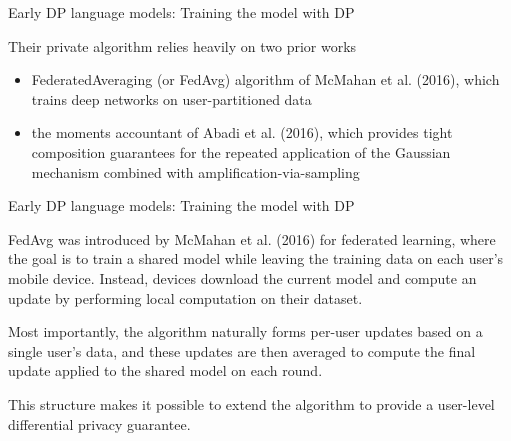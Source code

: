 \documentclass[12pt,aspectratio=169,handout]{beamer}
\begin{document}
\begin{frame}{Early DP language models: Training the model with DP}

Their private algorithm relies heavily on two prior works
\begin{itemize}
\item FederatedAveraging (or FedAvg) algorithm of McMahan et al. (2016), which trains deep networks on user-partitioned data
\item the moments accountant of Abadi et al. (2016), which provides tight composition guarantees for the repeated application of the Gaussian mechanism combined with amplification-via-sampling
\end{itemize}


\end{frame}


\begin{frame}{Early DP language models: Training the model with DP}

FedAvg was introduced by McMahan et al. (2016) for federated learning, where the goal is to train a shared model while leaving the training data on each user’s mobile device. Instead, devices download the current model and compute an update by performing local computation on their dataset.

Most importantly, the algorithm naturally forms per-user updates based on a single user’s data, and these updates are then averaged to compute the final update applied to the shared model on each round.

This structure makes it possible to extend the algorithm to provide a user-level differential privacy guarantee.


\end{frame}
\end{document}
